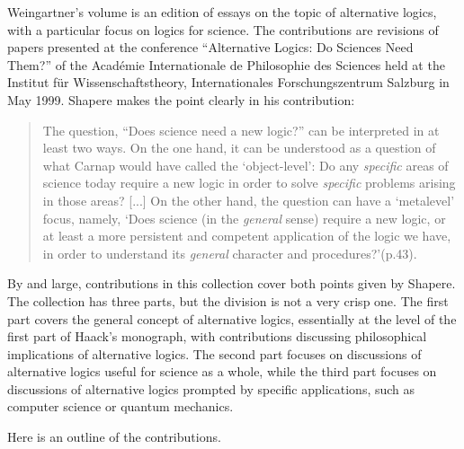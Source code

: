 \documentclass[11pt]{article}
\newcommand{\<}{\langle}
\renewcommand{\>}{\rangle}
\begin{document}
Weingartner's volume is an edition of essays on the topic of
alternative logics, with a particular focus on logics for science. 
The contributions are revisions of papers presented at the conference
``Alternative Logics: Do Sciences Need Them?'' of the Acad\'emie
Internationale de Philosophie des Sciences held at the Institut f\"ur
Wissenschaftstheory, Internationales Forschungszentrum Salzburg in May
1999. 
Shapere makes the point clearly in his contribution:
\begin{quote}
The question, ``Does science need a new logic?'' can be interpreted in
at least two ways. On the one hand, it can be understood as a question
of what Carnap would have called the `object-level': Do any
\emph{specific} areas of science today require a new logic in order to
solve \emph{specific} problems arising in those areas? [...] On the
other hand, the question can have a `metalevel' focus, namely, `Does
science (in the \emph{general} sense) require a new logic, or at least
a more persistent and competent application of the logic we have, in
order to understand its \emph{general} character and procedures?'(p.43).
\end{quote}

By and large, contributions in this collection cover both 
points given by Shapere. 
The collection has three parts, but the division is not a very crisp one. 
The first part covers the general concept of
alternative logics, essentially at the level of the first part of
Haack's monograph, with contributions discussing philosophical
implications of alternative logics. 
The second part focuses on discussions of alternative logics useful
for science as a whole, while the third part focuses on discussions
of alternative logics prompted by specific applications, such as
computer science or quantum mechanics.

Here is an outline of the contributions.
\end{document}
